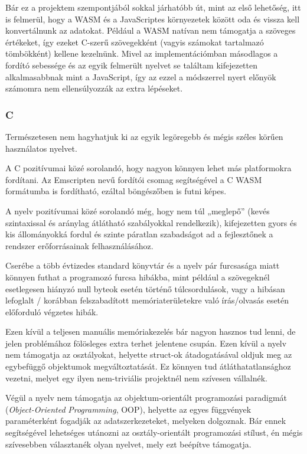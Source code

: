 Bár ez a projektem szempontjából sokkal járhatóbb út, mint az első lehetőség, itt is felmerül, hogy a WASM és a JavaScriptes környezetek között oda és vissza kell konvertálnunk az adatokat. Például a WASM natívan nem támogatja a szöveges értékeket\cite{wasmstring}, így ezeket C-szerű szövegekként (vagyis számokat tartalmazó tömbökként) kellene kezelnünk. Mivel az implementációmban másodlagos a fordító sebessége és az egyik felmerült nyelvet se találtam kifejezetten alkalmasabbnak mint a JavaScript, így az ezzel a módszerrel nyert előnyök számomra nem ellensúlyozzák az extra lépéseket.

\subsubsection{C}

Természetesen nem hagyhatjuk ki az egyik legöregebb és mégis széles körűen használatos nyelvet.

A C pozitívumai közé sorolandó, hogy nagyon könnyen lehet más platformokra fordítani. Az Emscripten nevű fordítói csomag segítségével a C WASM formátumba is fordítható, ezáltal böngészőben is futni képes.

A nyelv pozitívumai közé sorolandó még, hogy nem túl „meglepő” (kevés szintaxissal és aránylag átlátható szabályokkal rendelkezik), kifejezetten gyors és kis állományokká fordul és szinte páratlan szabadságot ad a fejlesztőnek a rendszer erőforrásainak felhasználásához.

Cserébe a több évtizedes standard könyvtár és a nyelv pár furcsasága miatt könnyen futhat a programozó furcsa hibákba, mint például a szövegeknél esetlegesen hiányzó null byteok esetén történő túlcsordulások, vagy a hibásan lefoglalt / korábban felszabadított memóriaterületekre való írás/olvasás esetén előforduló végzetes hibák.

Ezen kívül a teljesen manuális memóriakezelés bár nagyon hasznos tud lenni, de jelen problémához fölösleges extra terhet jelentene csupán. Ezen kívül a nyelv nem támogatja az osztályokat, helyette struct-ok átadogatásával oldjuk meg az egybefüggő objektumok megváltoztatását. Ez könnyen tud átláthatatlansághoz vezetni, melyet egy ilyen nem-triviális projektnél nem szívesen vállalnék.

Végül a nyelv nem támogatja az objektum-orientált programozási paradigmát (\textit{Object-Oriented} \textit{Programming}, OOP), helyette az egyes függvények paraméterként fogadják az adatszerkezeteket, melyeken dolgoznak. Bár ennek segítségével lehetséges utánozni az osztály-orientált programozási stílust, én mégis szívesebben választanék olyan nyelvet, mely ezt beépítve támogatja.

